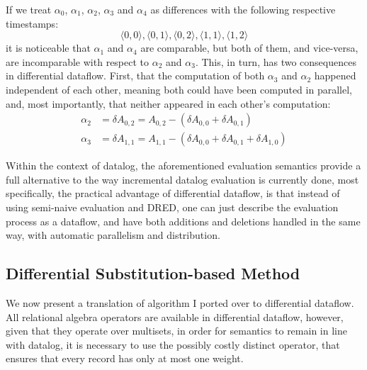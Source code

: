 \documentclass[sigconf,screen,review,natbib]{acmart}
\theoremstyle{definition}
\begin{document}
If we treat $\alpha_0$, $\alpha_1$, $\alpha_2$, $\alpha_3$ and $\alpha_4$ as differences with the following
respective timestamps: \[\langle 0, 0 \rangle, \langle 0, 1 \rangle, \langle 0, 2 \rangle, \langle 1, 1 \rangle, \langle 1, 2 \rangle\]
it is noticeable that $\alpha_1$ and $\alpha_4$ are comparable, but both of them, and vice-versa, are
incomparable with respect to $\alpha_2$ and $\alpha_3$. This, in turn, has two consequences in differential
dataflow. First, that the computation of both $\alpha_3$ and $\alpha_2$ happened independent of each other,
meaning both could have been computed in parallel, and, most importantly, that neither appeared in each other's
computation:
\begin{align*}
	\alpha_2 & = \delta A_{0, 2} = A_{0, 2} - (\delta A_{0, 0} + \delta A_{0, 1} )                  \\
	\alpha_3 & = \delta A_{1, 1} = A_{1, 1} - (\delta A_{0, 0} + \delta A_{0, 1} + \delta A_{1, 0})
\end{align*}

Within the context of datalog, the aforementioned evaluation semantics provide a full alternative to the way
incremental datalog evaluation is currently done, most specifically, the practical advantage of differential
dataflow, is that instead of using semi-naive evaluation and DRED, one can just describe the evaluation process
as a dataflow, and have both additions and deletions handled in the same way, with automatic parallelism and
distribution.

\subsection{Differential Substitution-based Method}

We now present a translation of algorithm I ported over to differential dataflow. All relational algebra
operators are available in differential dataflow, however, given that they operate over multisets, in order
for semantics to remain in line with datalog, it is necessary to use the possibly costly distinct operator,
that ensures that every record has only at most one weight.
\end{document}

